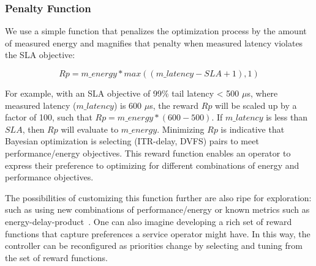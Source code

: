 \subsubsection{Penalty Function}
We use a simple function that penalizes the optimization process by the amount of measured energy and magnifies that penalty when measured latency violates the SLA objective:

\begin{equation} \label{eq:bayesopt_reward}
    Rp = m\_energy * max((m\_latency - SLA + 1), 1)
\end{equation}

For example, with an SLA objective of 99\% tail latency < 500 $\mu$s, where measured latency ($m\_latency$) is 600 $\mu$s, the reward $Rp$ will be scaled up by a factor of 100, such that $Rp = m\_energy * (600 - 500)$. If $m\_latency$ is less than $SLA$, then $Rp$ will evaluate to $m\_energy$. Minimizing $Rp$ is indicative that Bayesian optimization is selecting (ITR-delay, DVFS) pairs to meet performance/energy objectives. This reward function enables an operator to express their preference to optimizing for different combinations of energy and performance objectives.

The possibilities of customizing this function further are also ripe for exploration: such as using new combinations of performance/energy or known metrics such as energy-delay-product~\cite{573184,10.1109/40.888701}. One can also imagine developing a rich set of reward functions that capture preferences a service operator might have. In this way, the controller can be reconfigured as priorities change by selecting and tuning from the set of reward functions.



